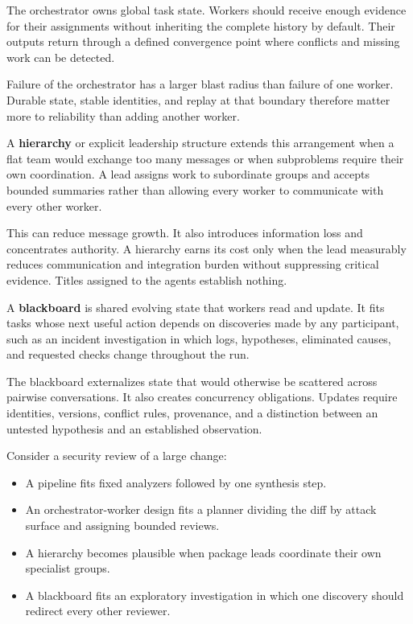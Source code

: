 The orchestrator owns global task state. Workers should receive enough evidence for their assignments without inheriting the complete history by default. Their outputs return through a defined convergence point where conflicts and missing work can be detected.

Failure of the orchestrator has a larger blast radius than failure of one worker. Durable state, stable identities, and replay at that boundary therefore matter more to reliability than adding another worker.

A \textbf{hierarchy} or explicit leadership structure extends this arrangement when a flat team would exchange too many messages or when subproblems require their own coordination. A lead assigns work to subordinate groups and accepts bounded summaries rather than allowing every worker to communicate with every other worker.

This can reduce message growth. It also introduces information loss and concentrates authority. A hierarchy earns its cost only when the lead measurably reduces communication and integration burden without suppressing critical evidence. Titles assigned to the agents establish nothing.

A \textbf{blackboard} is shared evolving state that workers read and update. It fits tasks whose next useful action depends on discoveries made by any participant, such as an incident investigation in which logs, hypotheses, eliminated causes, and requested checks change throughout the run.

The blackboard externalizes state that would otherwise be scattered across pairwise conversations. It also creates concurrency obligations. Updates require identities, versions, conflict rules, provenance, and a distinction between an untested hypothesis and an established observation.

Consider a security review of a large change:

\begin{itemize}
\tightlist
\item
  A pipeline fits fixed analyzers followed by one synthesis step.
\item
  An orchestrator-worker design fits a planner dividing the diff by attack surface and assigning bounded reviews.
\item
  A hierarchy becomes plausible when package leads coordinate their own specialist groups.
\item
  A blackboard fits an exploratory investigation in which one discovery should redirect every other reviewer.
\end{itemize}

